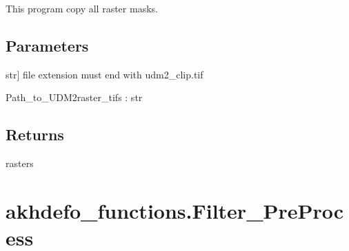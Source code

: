 \documentclass[letterpaper,10pt]{sphinxmanual}
\begin{document}
\begin{fulllineitems}
\label{\detokenize{generated/akhdefo_functions.copyUDM2_Mask_Data:akhdefo_functions.copyUDM2_Mask_Data}}
\pysigstartsignatures
{}
\pysigstopsignatures
\sphinxAtStartPar
This program copy all  raster masks.


\section{Parameters}
\label{\detokenize{generated/akhdefo_functions.copyUDM2_Mask_Data:parameters}}\begin{description}
\sphinxlineitem{path\_to\_unzipped\_folders}{[}str{]}
\sphinxAtStartPar
file extension must end with udm2\_clip.tif

\end{description}

\sphinxAtStartPar
Path\_to\_UDM2raster\_tifs : str


\section{Returns}
\label{\detokenize{generated/akhdefo_functions.copyUDM2_Mask_Data:returns}}
\sphinxAtStartPar
rasters

\end{fulllineitems}


\sphinxstepscope


\chapter{akhdefo\_functions.Filter\_PreProcess}
\label{\detokenize{generated/akhdefo_functions.Filter_PreProcess:akhdefo-functions-filter-preprocess}}\label{\detokenize{generated/akhdefo_functions.Filter_PreProcess::doc}}
\end{document}
